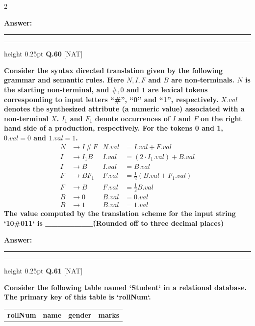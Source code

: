 \documentclass[a4paper,10pt,twoside]{article}
\begin{document}
\begin{multicols}{2}
\par\vspace{3pt}\noindent\textbf{Answer:} \rule{3.2cm}{0.4pt}
\par\vspace{6pt}\hrule height 0.25pt\vspace{6pt}
\noindent\textbf{Q.60} \hfill {\footnotesize\textsf{[NAT]}}
\par\vspace{2pt}
{\bfseries Consider the syntax directed translation given by the following grammar and semantic rules. Here $N, I, F$ and $B$ are non-terminals. $N$ is the starting non-terminal, and $\#, 0$ and $1$ are lexical tokens corresponding to input letters ``\#'', ``0'' and ``1'', respectively. $X.val$ denotes the synthesized attribute (a numeric value) associated with a non-terminal $X$. $I_1$ and $F_1$ denote occurrences of $I$ and $F$ on the right hand side of a production, respectively. For the tokens 0 and 1, $0.val = 0$ and $1.val = 1$.
\begin{align*}
N &\to I \,\#\, F & N.val &= I.val + F.val \\
I &\to I_1 B & I.val &= (2 \cdot I_1.val) + B.val \\
I &\to B & I.val &= B.val \\
F &\to B F_1 & F.val &= \frac{1}{2}(B.val + F_1.val) \\
F &\to B & F.val &= \frac{1}{2}B.val \\
B &\to 0 & B.val &= 0.val \\
B &\to 1 & B.val &= 1.val
\end{align*}
The value computed by the translation scheme for the input string `10\#011` is \_\_\_\_\_\_\_\_\. (Rounded off to three decimal places) \par}
\par\vspace{3pt}\noindent\textbf{Answer:} \rule{3.2cm}{0.4pt}
\par\vspace{6pt}\hrule height 0.25pt\vspace{6pt}
\noindent\textbf{Q.61} \hfill {\footnotesize\textsf{[NAT]}}
\par\vspace{2pt}
{\bfseries Consider the following table named `Student` in a relational database. The primary key of this table is `rollNum`.
\begin{center}
\begin{tabular}{|c|c|c|c|}
\hline
\textbf{rollNum} & \textbf{name} & \textbf{gender} & \textbf{marks} \\

\end{tabular}
\end{center}}
\end{multicols}
\end{document}
